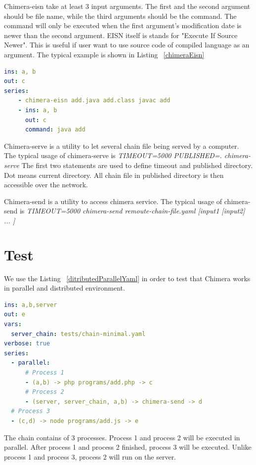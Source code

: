 \documentclass[conference]{IEEEtran}
\begin{document}
Chimera-eisn take at least 3 input arguments. The first and the second argument should
be file name, while the third arguments should be the command. The command will only
be executed when the first argument's modification date is newer than the second 
argument. EISN itself is stands for "Execute If Source Newer". This is useful if user
want to use source code of compiled language as an argument. 
The typical example is shown in Listing ~\ref{chimeraEisn}

\begin{lstlisting}[caption=Chimera-eisn usage example, label=chimeraEisn, language=yaml, basicstyle=\small, breaklines=true]
ins: a, b
out: c
series:
    - chimera-eisn add.java add.class javac add
    - ins: a, b
      out: c
      command: java add
\end{lstlisting}

Chimera-serve is a utility to let several chain file being served by a computer.
The typical usage of chimera-serve is {\it TIMEOUT=5000 PUBLISHED=. chimera-serve}
The first two statements are used to define timeout and published directory. Dot means
current directory. All chain file in published directory is then accessible over
the network.

Chimera-send is a utility to access chimera service.
The typical usage of chimera-send is {\it TIMEOUT=5000 chimera-send remoute-chain-file.yaml [input1 [input2] ... ]}


\section{Test}

We use the Listing ~\ref{ditributedParallelYaml} in order to test that Chimera works
in parallel and distributed environment.

\begin{lstlisting}[caption=Chimera-eisn usage example, label=chimeraEisn, language=yaml, basicstyle=\small, breaklines=true]
ins: a,b,server
out: e
vars:
  server_chain: tests/chain-minimal.yaml 
verbose: true
series:
  - parallel:
      # Process 1
      - (a,b) -> php programs/add.php -> c
      # Process 2
      - (server, server_chain, a,b) -> chimera-send -> d
  # Process 3
  - (c,d) -> node programs/add.js -> e
\end{lstlisting}

The chain contains of 3 processes. Process 1 and process 2 will be executed in parallel.
After process 1 and process 2 finished, process 3 will be executed. Unlike process 1 and
process 3, process 2 will run on the server.
\end{document}
